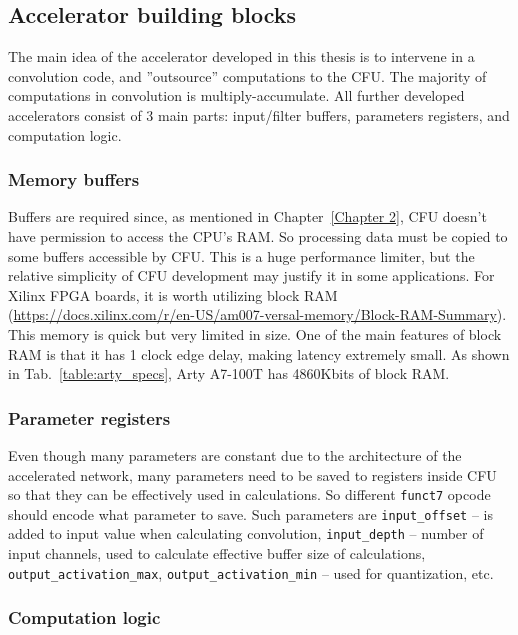 

\subsection{Accelerator building blocks}

The main idea of the accelerator developed in this thesis is to intervene in a convolution code, and ''outsource'' computations to the CFU. The majority of computations in convolution is multiply-accumulate. All further developed accelerators consist of 3 main parts: input/filter buffers, parameters registers, and computation logic.

\subsubsection{Memory buffers}

Buffers are required since, as mentioned in Chapter~\ref{Chapter 2}, CFU doesn't have permission to access the CPU's RAM. So processing data must be copied to some buffers accessible by CFU. This is a huge performance limiter, but the relative simplicity of CFU development may justify it in some applications. For Xilinx FPGA boards, it is worth utilizing block RAM (\url{https://docs.xilinx.com/r/en-US/am007-versal-memory/Block-RAM-Summary}). This memory is quick but very limited in size. One of the main features of block RAM is that it has 1 clock edge delay, making latency extremely small. As shown in Tab.~\ref{table:arty_specs}, Arty A7-100T has 4860Kbits of block RAM. 


\subsubsection{Parameter registers}
Even though many parameters are constant due to the architecture of the accelerated network, many parameters need to be saved to registers inside CFU so that they can be effectively used in calculations. So different \verb|funct7| opcode should encode what parameter to save. Such parameters are \verb|input_offset| -- is added to input value when calculating convolution, \verb|input_depth| -- number of input channels, used to calculate effective buffer size of calculations, \verb|output_activation_max|, \verb|output_activation_min| -- used for quantization, etc. 


\subsubsection{Computation logic}

